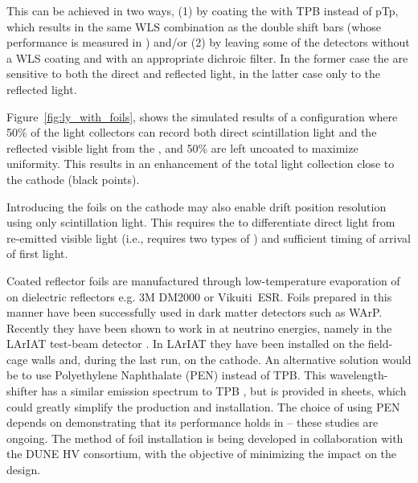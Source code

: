 This can be achieved in two ways, (1) by coating the  with TPB instead of pTp, which results in the same WLS combination as the double shift bars (whose performance is measured in )
and/or (2) by leaving some of the  detectors without a  
WLS coating and with an appropriate dichroic filter. In the former case the   are sensitive to both the direct and reflected light, in the latter case only to the reflected light. 

Figure~\ref{fig:ly_with_foils}, shows the simulated results of a configuration where 50\% of the  light collectors can %
record both direct scintillation light and the reflected visible light from the ,  and 50\% are left uncoated to maximize uniformity. This results in an enhancement of the total light collection close to the cathode (black points). %

Introducing the foils on the cathode may also enable drift position resolution using only scintillation light. This requires the  to  
differentiate direct  light from re-emitted visible light (i.e., requires two 
types of ) and 
sufficient timing of arrival of first light.

Coated reflector foils are manufactured through low-temperature evaporation of  on dielectric reflectors e.g. 3M DM2000 or Vikuiti\texttrademark\  ESR. Foils prepared in this manner have been successfully used in dark matter detectors such as WArP\cite{Acciarri:2008kv}. Recently they have been shown to work in  at neutrino energies, namely  in the LArIAT test-beam detector \cite{Garcia-Gamez:2017cmu}. In LArIAT they have been installed on the field-cage walls and, during the last run, on the cathode. An alternative solution would be to use Polyethylene Naphthalate (PEN) instead of TPB. This wavelength-shifter has a similar emission spectrum to TPB \cite{Kuzniak:2018dcf}, but is provided in sheets, which could greatly simplify the production and installation. The choice of using PEN depends on demonstrating that its performance holds in \lar -- these studies are ongoing. 
The method of foil installation is being developed in collaboration with the DUNE HV consortium, with the objective of minimizing the impact on the  design. 

